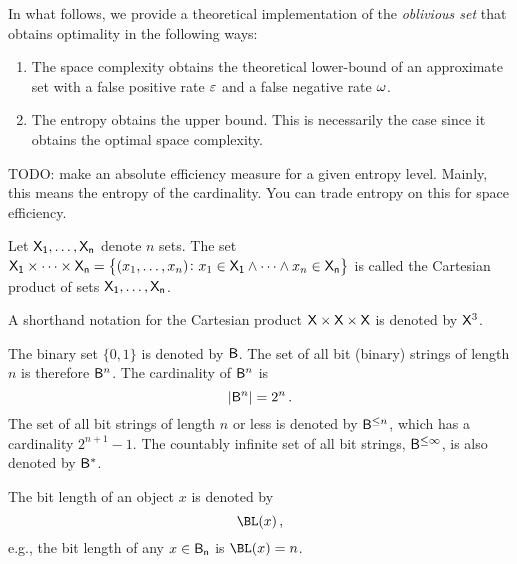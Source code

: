 \documentclass[ ../main.tex]{subfiles}
\begin{document}
In what follows, we provide a theoretical implementation of the \emph{oblivious 
set} that obtains optimality in the following ways:
\begin{enumerate}
    \item The space complexity obtains the theoretical lower-bound of an approximate set with a false positive rate $\varepsilon$ and a false negative rate $\omega$.
    \item The entropy obtains the upper bound. This is necessarily the case since it obtains the optimal space complexity.
\end{enumerate}

TODO: make an absolute efficiency measure for a given entropy level. Mainly, this means the entropy of the cardinality. You can trade entropy on this for space efficiency.

\begin{definition}
Let $\Set{X}[1],\ldots,\Set{X}[n]$ denote $n$ sets. The set $\Set{X}[1] \times \cdots \times \Set{X}[n] = \left\{(x_1,\ldots,x_n) \colon x_1 \in \Set{X}[1] \land \cdots \land x_n \in \Set{X}[n]\right\}$ is called the Cartesian product of sets $\Set{X}[1],\ldots,\Set{X}[n]$.
\end{definition}
A shorthand notation for the Cartesian product $\Set{X} \times \Set{X} \times \Set{X}$ is denoted by $\Set{X}^3$.

The binary set $\{0,1\}$ is denoted by $\Set{B}$. The set of all bit (binary) strings of length $n$ is therefore $\Set{B}^n$. The cardinality of $\Set{B}^n$ is
\begin{equation}
    \Card{\Set{B}^n} = 2^n\,.
\end{equation}
The set of all bit strings of length $n$ or less is denoted by $\Set{B}^{\leq n}$, which has a cardinality $2^{n+1}-1$. The countably infinite set of all bit strings, $\Set{B}^{\leq \infty}$, is also denoted by $\Set{B}^{*}$.

The bit length of an object $x$ is denoted by
\begin{equation}
    \BL(x)\,,
\end{equation}
e.g., the bit length of any $x \in \Set{B}[n]$ is $\BL(x) = n$.
\end{document}
